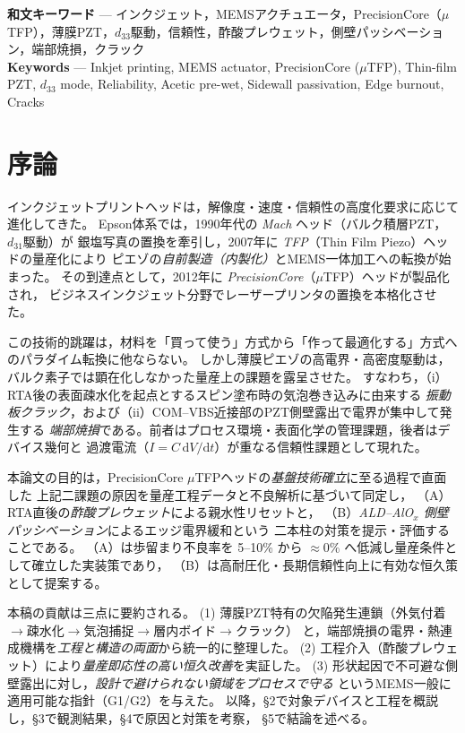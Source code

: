 \documentclass[conference]{IEEEtran}
\begin{document}
\begin{IEEEkeywords}
\textbf{和文キーワード} — インクジェット，MEMSアクチュエータ，PrecisionCore（$\mu$TFP），薄膜PZT，$d_{33}$駆動，信頼性，酢酸プレウェット，側壁パッシベーション，端部焼損，クラック \\
\textbf{Keywords} — Inkjet printing, MEMS actuator, PrecisionCore ($\mu$TFP), Thin-film PZT, $d_{33}$ mode, Reliability, Acetic pre-wet, Sidewall passivation, Edge burnout, Cracks
\end{IEEEkeywords}


\section{序論}
インクジェットプリントヘッドは，解像度・速度・信頼性の高度化要求に応じて進化してきた。
Epson体系では，1990年代の \emph{Mach} ヘッド（バルク積層PZT，$d_{31}$駆動）が
銀塩写真の置換を牽引し，2007年に \emph{TFP}（Thin Film Piezo）ヘッドの量産化により
ピエゾの\emph{自前製造（内製化）}とMEMS一体加工への転換が始まった。
その到達点として，2012年に \emph{PrecisionCore}（$\mu$TFP）ヘッドが製品化され，
ビジネスインクジェット分野でレーザープリンタの置換を本格化させた。

この技術的跳躍は，材料を「買って使う」方式から「作って最適化する」方式へのパラダイム転換に他ならない。
しかし薄膜ピエゾの高電界・高密度駆動は，バルク素子では顕在化しなかった量産上の課題を露呈させた。
すなわち，（i）RTA後の表面疎水化を起点とするスピン塗布時の気泡巻き込みに由来する
\emph{振動板クラック}，および（ii）COM–VBS近接部のPZT側壁露出で電界が集中して発生する
\emph{端部焼損}である。前者はプロセス環境・表面化学の管理課題，後者はデバイス幾何と
過渡電流（$I=C\,\mathrm{d}V/\mathrm{d}t$）が重なる信頼性課題として現れた。

本論文の目的は，PrecisionCore $\mu$TFPヘッドの\emph{基盤技術確立}に至る過程で直面した
上記二課題の原因を量産工程データと不良解析に基づいて同定し，
（A）RTA直後の\emph{酢酸プレウェット}による親水性リセットと，
（B）\emph{ALD–AlO$_x$ 側壁パッシベーション}によるエッジ電界緩和という
二本柱の対策を提示・評価することである。
（A）は歩留まり不良率を 5–10\% から \(\approx 0\%\) へ低減し量産条件として確立した実装策であり，
（B）は高耐圧化・長期信頼性向上に有効な恒久策として提案する。

本稿の貢献は三点に要約される。
(1) 薄膜PZT特有の欠陥発生連鎖（外気付着$\rightarrow$疎水化$\rightarrow$気泡捕捉$\rightarrow$層内ボイド$\rightarrow$クラック）
と，端部焼損の電界・熱連成機構を\emph{工程と構造の両面}から統一的に整理した。
(2) 工程介入（酢酸プレウェット）により\emph{量産即応性の高い恒久改善}を実証した。
(3) 形状起因で不可避な側壁露出に対し，\emph{設計で避けられない領域をプロセスで守る}
というMEMS一般に適用可能な指針（G1/G2）を与えた。
以降，\S2で対象デバイスと工程を概説し，\S3で観測結果，\S4で原因と対策を考察，
\S5で結論を述べる。
\end{document}

